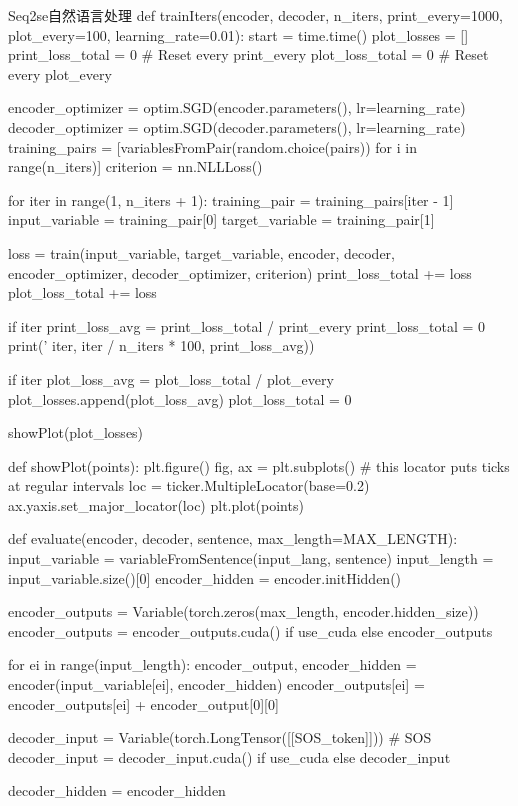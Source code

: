 \documentclass[openbib]{article}
\begin{document}
\begin{Python}{Seq2se自然语言处理}
def trainIters(encoder, decoder, n_iters, print_every=1000, plot_every=100, learning_rate=0.01):
	start = time.time()
	plot_losses = []
	print_loss_total = 0  # Reset every print_every
	plot_loss_total = 0  # Reset every plot_every

	encoder_optimizer = optim.SGD(encoder.parameters(), lr=learning_rate)
	decoder_optimizer = optim.SGD(decoder.parameters(), lr=learning_rate)
	training_pairs = [variablesFromPair(random.choice(pairs))
						for i in range(n_iters)]
	criterion = nn.NLLLoss()

	for iter in range(1, n_iters + 1):
		training_pair = training_pairs[iter - 1]
		input_variable = training_pair[0]
		target_variable = training_pair[1]

		loss = train(input_variable, target_variable, encoder,
					decoder, encoder_optimizer, decoder_optimizer, criterion)
		print_loss_total += loss
		plot_loss_total += loss

		if iter %
			print_loss_avg = print_loss_total / print_every
			print_loss_total = 0
			print('%
					iter, iter / n_iters * 100, print_loss_avg))

		if iter %
			plot_loss_avg = plot_loss_total / plot_every
			plot_losses.append(plot_loss_avg)
			plot_loss_total = 0

	showPlot(plot_losses)

def showPlot(points):
	plt.figure()
	fig, ax = plt.subplots()
	# this locator puts ticks at regular intervals
	loc = ticker.MultipleLocator(base=0.2)
	ax.yaxis.set_major_locator(loc)
	plt.plot(points)

def evaluate(encoder, decoder, sentence, max_length=MAX_LENGTH):
	input_variable = variableFromSentence(input_lang, sentence)
	input_length = input_variable.size()[0]
	encoder_hidden = encoder.initHidden()
	
	encoder_outputs = Variable(torch.zeros(max_length, encoder.hidden_size))
	encoder_outputs = encoder_outputs.cuda() if use_cuda else encoder_outputs
	
	for ei in range(input_length):
		encoder_output, encoder_hidden = encoder(input_variable[ei],
												encoder_hidden)
		encoder_outputs[ei] = encoder_outputs[ei] + encoder_output[0][0]
	
	decoder_input = Variable(torch.LongTensor([[SOS_token]]))  # SOS
	decoder_input = decoder_input.cuda() if use_cuda else decoder_input
	
	decoder_hidden = encoder_hidden
	

\end{Python}
\end{document}
